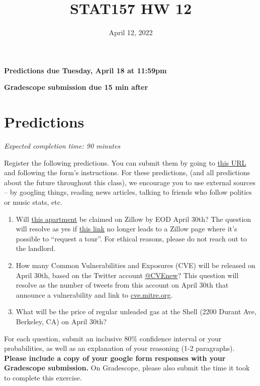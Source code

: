 \documentclass[11pt]{article}
\title{STAT157 HW 12}
\date{April 12, 2022}
\begin{document}
\maketitle

\hfill \textbf{Predictions due Tuesday, April 18 at 11:59pm}

\hfill \textbf{Gradescope submission due 15 min after}

\section*{Predictions}

\emph{Expected completion time: 90 minutes}

Register the following predictions. You can submit them by going to \href{https://docs.google.com/forms/d/1GtTv93jJqtHLPuYAle5L9XQFdcTDxNm-hsitq9hiK4w/edit}{this URL} and following the form's instructions. For these predictions, (and all predictions about the future throughout this class), we encourage you to use external sources -- by googling things, reading news articles, talking to friends who follow politics or music stats, etc.

\begin{enumerate}
	\item Will \href{https://www.zillow.com/homedetails/2390-Parker-St-1-Berkeley-CA-94704/2058220427_zpid/}{this apartment} be claimed on Zillow by EOD April 30th? The question will resolve as yes if \href{https://www.zillow.com/homedetails/2390-Parker-St-1-Berkeley-CA-94704/2058220427_zpid/}{this link} no longer leads to a Zillow page where it's possible to ``request a tour''. For ethical reasons, please do not reach out to the landlord.
	\item How many Common Vulnerabilities and Exposures (CVE) will be released on April 30th, based on the Twitter account \href{https://twitter.com/CVEnew?ref_src=twsrc}{@CVEnew}? This question will resolve as the number of tweets from this account on April 30th that announce a vulnerability and link to \url{cve.mitre.org}.
	\item What will be the price of regular unleaded gas at the Shell (2200 Durant Ave, Berkeley, CA) on April 30th?
\end{enumerate}
For each question, submit an inclusive 80\% confidence interval or your probabilities, as well as an explanation of your reasoning (1-2 paragraphs).
\textbf{Please include a copy of your google form responses with your Gradescope submission.}
On Gradescope, please also submit the time it took to complete this exercise.
\end{document}
